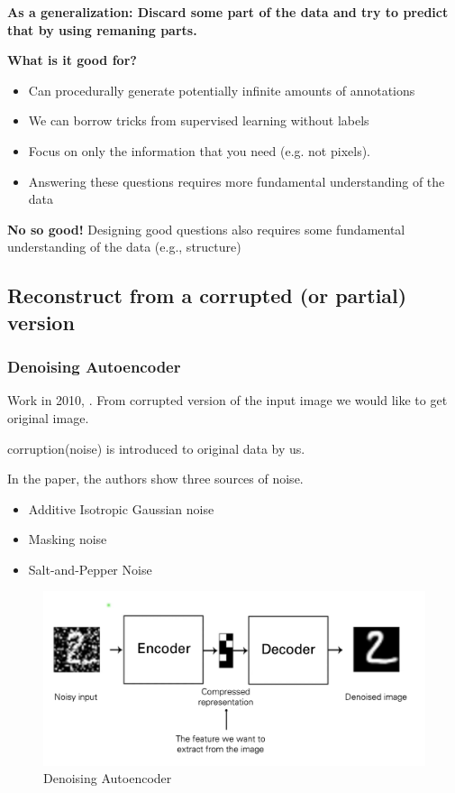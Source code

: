 \documentclass{article}
\begin{document}
\textbf{As a generalization: Discard some part of the data and 
try to predict that by using remaning parts.}
 
\textbf{What is it good for?}
\begin{itemize}
   \item Can procedurally generate potentially infinite amounts of annotations
   \item We can borrow tricks from supervised learning without labels
   \item Focus on only the information that you need (e.g. not pixels).
   \item Answering these questions requires more fundamental understanding of the data
\end{itemize}
 
\textbf{No so good!}
Designing good questions also requires some fundamental understanding of the data
(e.g., structure)
 
\subsection{Reconstruct from a corrupted (or partial) version}
 
\subsubsection{Denoising Autoencoder}
\label{sec:subsubsections}
 
Work in 2010, \cite{JMLR:v11:vincent10a}.
From corrupted version of the input image we would like to
get original image.
 
corruption(noise) is introduced to original data by us.
 
In the paper, the authors show three sources of noise.
\begin{itemize}
   \item Additive Isotropic Gaussian noise
   \item Masking noise
   \item Salt-and-Pepper Noise
\end{itemize}
 
\begin{figure}[H]
   \centering
   \includegraphics[width=0.8\linewidth]{figures/denoising_autoencoder.png}
   \caption{ Denoising Autoencoder}
   \end{figure}
 
\end{document}
